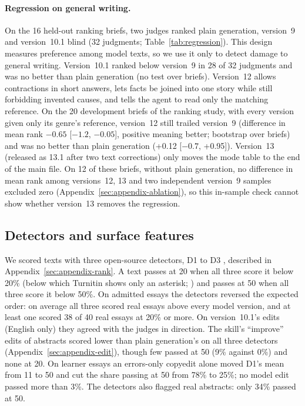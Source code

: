 \documentclass[11pt]{article}
\newcommand{\shipver}{13.1}
\begin{document}
\paragraph{Regression on general writing.} On the 16 held-out ranking briefs, two judges ranked plain generation, version~9 and version~10.1 blind (32 judgments; Table~\ref{tab:regression}). This design measures preference among model texts, so we use it only to detect damage to general writing. Version~10.1 ranked below version~9 in 28 of 32 judgments and was no better than plain generation (no test over briefs). Version~12 allows contractions in short answers, lets facts be joined into one story while still forbidding invented causes, and tells the agent to read only the matching reference. On the 20 development briefs of the ranking study, with every version given only its genre's reference, version~12 still trailed version~9 (difference in mean rank $-0.65$ [$-1.2$, $-0.05$], positive meaning better; bootstrap over briefs) and was no better than plain generation (+0.12 [$-0.7$, +0.95]). Version~13 (released as \shipver{} after two text corrections) only moves the mode table to the end of the main file. On 12 of these briefs, without plain generation, no difference in mean rank among versions~12, 13 and two independent version~9 samples excluded zero (Appendix~\ref{sec:appendix-ablation}), so this in-sample check cannot show whether version~13 removes the regression.

\subsection{Detectors and surface features}
\label{sec:detectors}

We scored texts with three open-source detectors, D1 to D3 \citep{desklib2025detector,fakespot2025detector,superannotate2024detector}, described in Appendix~\ref{sec:appendix-rank}. A text passes at 20 when all three score it below 20\% (below which Turnitin shows only an asterisk; \citealp{turnitin2026report}) and passes at 50 when all three score it below 50\%. On admitted essays the detectors reversed the expected order: on average all three scored real essays above every model version, and at least one scored 38 of 40 real essays at 20\% or more. On version~10.1's edits (English only) they agreed with the judges in direction. The skill's ``improve'' edits of abstracts scored lower than plain generation's on all three detectors (Appendix~\ref{sec:appendix-edit}), though few passed at 50 (9\% against 0\%) and none at 20. On learner essays an errors-only copyedit alone moved D1's mean from 11 to 50 and cut the share passing at 50 from 78\% to 25\%; no model edit passed more than 3\%. The detectors also flagged real abstracts: only 34\% passed at 50.
\end{document}
